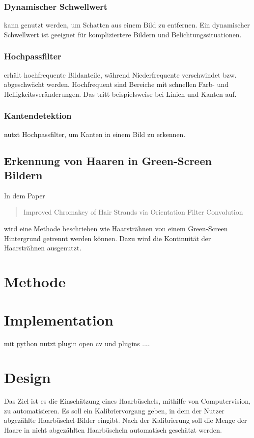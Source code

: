 \documentclass[german,a4paper,12pt]{llncs}
\begin{document}
\subsubsection{Dynamischer Schwellwert}
kann genutzt werden, um Schatten aus einem Bild zu entfernen. Ein dynamischer Schwellwert ist geeignet für kompliziertere Bildern und Belichtungssituationen.


\subsubsection{Hochpassfilter}
erhält hochfrequente Bildanteile, während Niederfrequente verschwindet bzw. abgeschwächt werden. 
Hochfrequent sind Bereiche mit schnellen Farb- und Helligkeitsveränderungen. Das tritt beispielsweise bei Linien und Kanten auf.

\subsubsection{Kantendetektion}

nutzt Hochpassfilter, um Kanten in einem Bild zu erkennen. 

\subsection{Erkennung von Haaren in Green-Screen Bildern}

In dem Paper\blockquote{Improved Chromakey of Hair Strands via Orientation Filter Convolution} wird eine Methode beschrieben wie Haarsträhnen von einem Green-Screen Hintergrund getrennt werden können. Dazu wird die Kontinuität der Haarsträhnen ausgenutzt. \cite{GreenScreenHair}

\section{Methode}

\section{Implementation}

mit python
nutzt plugin open cv und plugins ....

\section{Design}

Das Ziel ist es die Einschätzung eines Haarbüschels, mithilfe von Computervision, zu automatisieren. Es soll ein Kalibriervorgang geben, in dem der Nutzer abgezählte Haarbüschel-Bilder eingibt. Nach der Kalibrierung soll die Menge der Haare in nicht abgezählten Haarbüscheln automatisch geschätzt werden.
\end{document}
